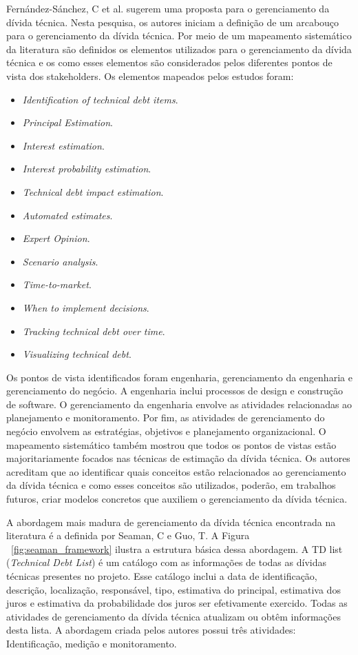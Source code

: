 Fernández-Sánchez, C et al.\cite{fernandez2015framework} sugerem uma proposta para o gerenciamento da dívida técnica. Nesta pesquisa, os autores iniciam a definição de um arcabouço para o gerenciamento da dívida técnica. Por meio de um mapeamento sistemático da literatura são definidos os elementos utilizados para o gerenciamento da dívida técnica e os como esses elementos são considerados pelos diferentes pontos de vista dos stakeholders. Os elementos mapeados pelos estudos foram:

\begin{itemize}
\item \textit{Identification of technical debt items}.
\item \textit{Principal Estimation}.
\item \textit{Interest estimation}.
\item \textit{Interest probability estimation}.
\item \textit{Technical debt impact estimation}.
\item \textit{Automated estimates}.
\item \textit{Expert Opinion}.
\item \textit{Scenario analysis}.
\item \textit{Time-to-market}.
\item \textit{When to implement decisions}.
\item \textit{Tracking technical debt over time}.
\item \textit{Visualizing technical debt}.
\end{itemize}

Os pontos de vista identificados foram engenharia, gerenciamento da engenharia e gerenciamento do negócio. A engenharia inclui processos de design e construção de software. O gerenciamento da engenharia envolve as atividades relacionadas ao planejamento e monitoramento. Por fim, as atividades de gerenciamento do negócio envolvem as estratégias, objetivos  e planejamento organizacional. O mapeamento sistemático também mostrou que todos os pontos de vistas estão majoritariamente focados nas técnicas de estimação da dívida técnica. Os autores acreditam que ao identificar quais conceitos estão relacionados ao gerenciamento da dívida técnica e como esses conceitos são utilizados, poderão, em trabalhos futuros, criar modelos concretos que auxiliem o gerenciamento da dívida técnica.

A abordagem mais madura de gerenciamento da dívida técnica encontrada na literatura é a definida por Seaman, C e Guo, T\cite{seaman2011measuring}. A Figura ~\ref{fig:seaman_framework}  ilustra a estrutura básica dessa abordagem. A TD list (\textit{Technical Debt List}) é um catálogo com as informações de todas as dívidas técnicas presentes no projeto. Esse catálogo inclui a data de identificação, descrição, localização, responsável, tipo, estimativa do principal, estimativa dos juros e estimativa da probabilidade dos juros ser efetivamente exercido. Todas as atividades de gerenciamento da dívida técnica atualizam ou obtêm informações desta lista. A abordagem criada pelos autores possui três atividades: Identificação, medição e monitoramento.  

